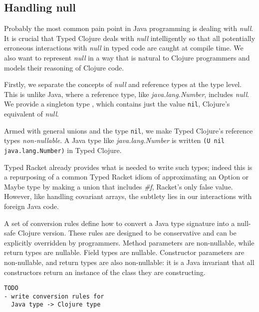 \subsection{Handling null}
\label{sec:null}

Probably the most common pain point in Java programming is dealing with \emph{null}.
It is crucial that Typed Clojure deals with \emph{null} intelligently so that
all potentially erroneous interactions with \emph{null} in typed code are caught at compile time.
We also want to represent \emph{null} in a way that is natural to Clojure programmers
and models their reasoning of Clojure code.

Firstly, we separate the concepts of \emph{null} and reference types at the type level.
This is unlike Java, where a reference type, like \emph{java.lang.Number}, includes \emph{null}.
We provide a singleton type \Nil{}, which contains just the value \lstinline|nil|,
Clojure's equivalent of \emph{null}. 

Armed with general unions and the type \lstinline|nil|, 
we make Typed Clojure's reference types \emph{non-nullable}.
A Java type like \emph{java.lang.Number} is written \lstinline|(U nil java.lang.Number)|
in Typed Clojure.

Typed Racket already provides what is needed to write such types; indeed this is a repurposing
of a common Typed Racket idiom of approximating an Option or Maybe type by
making a union that includes \emph{\#f}, Racket's only false value.
However, like handling covariant arrays, the subtlety lies in our interactions with foreign
Java code.

A set of conversion rules define how to convert a Java type signature into a null-safe
Clojure version. These rules are designed to be conservative and can be explicitly overridden
by programmers. Method parameters are non-nullable, while return types are nullable.
Field types are nullable. Constructor parameters are non-nullable, and return types
are also non-nullable: it is a Java invariant that all constructors return an instance
of the class they are constructing.

\begin{verbatim}
TODO 
- write conversion rules for 
  Java type -> Clojure type
\end{verbatim}


